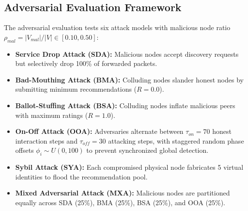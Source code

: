 \documentclass[journal,compsoc]{IEEEtran}
\begin{document}
\begin{table}[!t]
\centering
\caption{Topological Characteristics of Benchmark SNAP Sub-Graphs}
\label{tab:snap_topologies}
\end{table}

\subsection{Adversarial Evaluation Framework}
The adversarial evaluation tests six attack models with malicious node ratio $\rho_{mal} = |V_{mal}| / |V| \in [0.10, 0.50]$:
\begin{itemize}
    \item \textbf{Service Drop Attack (SDA):} Malicious nodes accept discovery requests but selectively drop 100\% of forwarded packets.
    \item \textbf{Bad-Mouthing Attack (BMA):} Colluding nodes slander honest nodes by submitting minimum recommendations ($R = 0.0$).
    \item \textbf{Ballot-Stuffing Attack (BSA):} Colluding nodes inflate malicious peers with maximum ratings ($R = 1.0$).
    \item \textbf{On-Off Attack (OOA):} Adversaries alternate between $\tau_{on} = 70$ honest interaction steps and $\tau_{off} = 30$ attacking steps, with staggered random phase offsets $\phi_i \sim U(0, 100)$ to prevent synchronized global detection.
    \item \textbf{Sybil Attack (SYA):} Each compromised physical node fabricates 5 virtual identities to flood the recommendation pool.
    \item \textbf{Mixed Adversarial Attack (MXA):} Malicious nodes are partitioned equally across SDA (25\%), BMA (25\%), BSA (25\%), and OOA (25\%).
\end{itemize}
\end{document}
